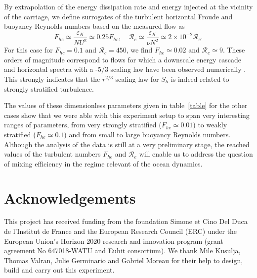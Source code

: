 \documentclass[a4paper, 12pt, times]{article}
\newcommand{\references}[0]{\vspace{16pt} \noindent {\sect References} \vspace{10pt}\\}
\newcommand{\R}{\mathcal{R}}
\newcommand{\epsK}{\varepsilon_{\!\scriptscriptstyle K}}
\begin{document}
\noindent By extrapolation of the energy dissipation rate and energy injected
at the vicinity of the carriage, we define surrogates of the turbulent
horizontal Froude and buoyancy Reynolds numbers based on the measured flow as
\begin{equation}
F_{he} \simeq \frac{\epsK}{N U^2} \simeq 0.25 F_{hc},\quad 
\R_e \simeq \frac{\epsK}{\nu N^2} \simeq 2\times10^{-2} \R_c.
\label{eq:e}
\end{equation}
For this case for $F_{hc} = 0.1$ and $\mathcal{R}_c=450$, we find
$F_{he} \simeq 0.02$ and $\mathcal{R}_e \simeq 9$. These orders of magnitude
correspond to flows for which a downscale energy cascade and horizontal spectra
with a -5/3 scaling law have been observed numerically
\cite[]{BrethouwerBillantLindborg2007, AugierBillantChomaz2015}.
%
This strongly indicates that the $r^{2/3}$ scaling law for $S_h$ is indeed
related to strongly stratified turbulence.

\noindent The values of these dimensionless parameters given in table~\ref{table} for the
other cases show that we were able with this experiment setup to span very
interesting ranges of parameters, from very strongly stratified
($F_{he} \simeq 0.01$) to weakly stratified ($F_{he} \simeq 0.1$) and from
small to large buoyancy Reynolds numbers.
%
Although the analysis of the data is still at a very preliminary stage, the
reached values of the turbulent numbers $F_{he}$ and $\R_e$ will enable us to
address the question of mixing efficiency in the regime relevant of the ocean
dynamics.

\section*{Acknowledgements}

This project has received funding from the foundation Simone et Cino Del Duca de
l'Institut de France and the European Research Council (ERC) under the European
Union's Horizon 2020 research and innovation program (grant agreement No
647018-WATU and Euhit consortium).
%
We thank Mile Kusulja, Thomas Valran, Julie Germinario and Gabriel Moreau for
their help to design, build and carry out this experiment.


\references
\def\refname{}
\vspace{-0.9in}


\end{document}
